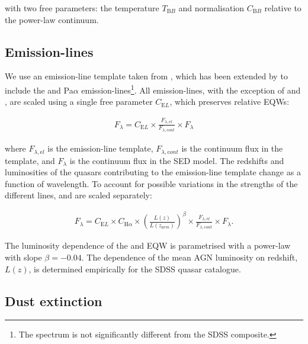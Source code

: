 \noindent with two free parameters: the temperature $T_{\mathrm BB}$ and normalisation $C_{\mathrm BB}$ relative to the power-law continuum. 

\subsection{Emission-lines}

We use an emission-line template taken from \citet{francis91}, which has been extended by \citet{maddox06} to include the \ha and Pa$\alpha$ emission-lines\footnote{The spectrum is not significantly different from the \citet{vandenberk01} SDSS composite.}. 
All emission-lines, with the exception of \ha and \hbns, are scaled using a single free parameter $C_{\mathrm EL}$, which preserves relative EQWs:

\begingroup\makeatletter{}\check@mathfonts
\begin{eqnarray}
  F_{\lambda} =  C_{\mathrm EL} \times \frac{F_{\lambda, \mathrm el}}{F_{\lambda, \mathrm cont}} \times F_{\lambda} 
\end{eqnarray} 
\endgroup

\noindent where $F_{\lambda, \mathrm el}$ is the emission-line template, $F_{\lambda,\mathrm cont}$ is the continuum flux in the template, and $F_{\lambda}$ is the continuum flux in the SED model.
The redshifts and luminosities of the quasars contributing to the emission-line template change as a function of wavelength. 
To account for possible variations in the strengths of the different lines, \ha and \hb are scaled separately: 

\begingroup\makeatletter{}\check@mathfonts
\begin{eqnarray}
  F_{\lambda} =  C_{\mathrm EL} \times C_{{\mathrm H} \alpha} \times \left( \frac{L(z)} {L(z_{\mathrm nrm})} \right)^{\beta} \times \frac{F_{\lambda, \mathrm el}}{F_{\lambda, \mathrm cont}} \times F_{\lambda}.
\end{eqnarray}
\endgroup

\noindent The luminosity dependence of the \ha and \hb EQW \citep[i.e. the Baldwin effect;][]{baldwin77} is parametrised with a power-law with slope $\beta=-0.04$.
The dependence of the mean AGN luminosity on redshift, $L(z)$, is determined empirically for the SDSS quasar catalogue. 

\subsection{Dust extinction}
\label{sec:sed-extinction} 


